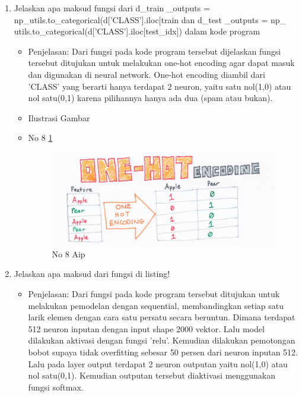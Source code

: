 \begin{enumerate}
\item Jelaskan apa maksud fungsi dari d\_train \_outputs = np\_utils.to\_categorical(d['CLASS'].iloc[train dan d\_test \_outputs = np\_ utils.to\_categorical(d['CLASS'].iloc[test\_idx]) dalam kode program
\begin{itemize}
\item Penjelasan: Dari fungsi pada kode program tersebut dijelaskan fungsi tersebut ditujukan untuk melakukan one-hot encoding agar dapat masuk dan digunakan di neural network. One-hot encoding diambil dari 'CLASS' yang berarti hanya terdapat 2 neuron, yaitu satu nol(1,0) atau nol satu(0,1) karena pilihannya hanya ada dua (spam atau bukan).
\par 
\par
\item Ilustrasi Gambar
\item No 8 \ref{teori8}
\begin{figure}[!hbtp]
\centering
\includegraphics[scale=0.4]{figures/AIP/g8.PNG}
\caption{No 8 Aip}
\label{teori8}
\end{figure}
\par
\end{itemize}
\par
\par

\item Jelaskan apa maksud dari fungsi di listing!

\begin{itemize}
\item Penjelasan: Dari fungsi pada kode program tersebut ditujukan untuk melakukan pemodelan dengan sequential, membandingkan setiap satu larik elemen dengan cara satu persatu secara beruntun. Dimana terdapat 512 neuron inputan dengan input shape 2000 vektor. Lalu model dilakukan aktivasi dengan fungsi 'relu'. Kemudian dilakukan pemotongan bobot supaya tidak overfitting sebesar 50 persen dari neuron inputan 512. Lalu pada layer output terdapat 2 neuron outputan yaitu nol(1,0) atau nol satu(0,1). Kemudian outputan tersebut diaktivasi menggunakan fungsi softmax.
\par 
\end{itemize}
\par
\par


\end{enumerate}
